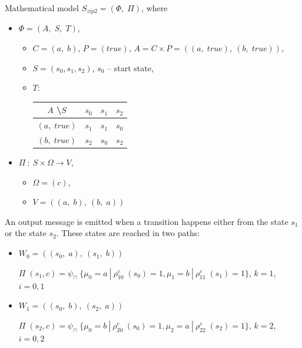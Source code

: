 \begin{enumerate}
Mathematical model $S_{zip2} = (\Phi, \; \Pi)$, where
  \begin{itemize}
  \item[] $\Phi = (A, \; S, \; T)$,
    \begin{itemize}
    \item[] $C = (a, \; b)$, $P = (true)$, $A = C \times P = ((a, \; true), \: (b, \; true))$,
    \item[] $S = (s_{0}, s_{1}, s_{2})$, $s_{0}$ -- start state,
    \item[] $T$:
      \begin{tabular}{c|c|c|c}
      $A$ \textbackslash $S$ & $s_{0}$ & $s_{1}$ & $s_{2}$\\
      \hline
      $(a, \; true)$ & $s_{1}$ & $s_{1}$ & $s_{0}$\\
      \hline
      $(b, \; true)$ & $s_{2}$ & $s_{0}$ & $s_{2}$\\
      \end{tabular}
    \end{itemize}
  \item[] $\Pi \: : \: S \times \Omega \to V$,
    \begin{itemize}
    \item[] $\Omega = (c)$,
    \item[] $V = ((a, \; b), \: (b, \; a))$
    \end{itemize}
  \end{itemize}

An output message is emitted when a transition happens either from the state $s_{1}$ or the state $s_{2}$. These states are reached in two paths:
  \begin{itemize}
  \item[]
$W_{0} = ((s_{0}, \; a), \: (s_{1}, \; b))$

$\Pi \; (s_{1}, c) = \psi_{\sqcap} \; \{\mu_{0} = a \: | \: \rho_{10}^{c} \; (s_{0}) = 1, \mu_{1} = b \: | \: \rho_{11}^{c} \; (s_{1}) = 1\}$, $k = 1$, $i = 0,1$
  \item[]
$W_{1} = ((s_{0}, \; b), \: (s_{2}, \; a))$

$\Pi \; (s_{2}, c) = \psi_{\sqcap} \; \{\mu_{0} = b \: | \: \rho_{20}^{c} \; (s_{0}) = 1, \mu_{2} = a \: | \: \rho_{22}^{c} \; (s_{2}) = 1\}$, $k = 2$, $i = 0,2$ 
  \end{itemize}
  \end{enumerate}


